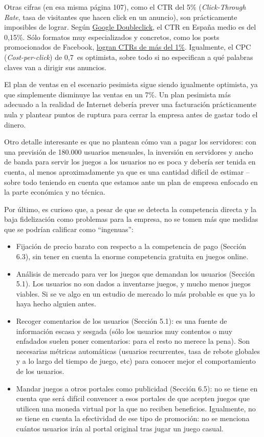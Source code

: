 \documentclass[nochap,palatino,shortheader]{apuntes}
\begin{document}
Otras cifras (en esa misma página 107), como el CTR del 5\% (\textit{Click-Through Rate}, tasa de visitantes que hacen click en un anuncio), son prácticamente imposibles de lograr. Según \href{http://www.richmediagallery.com/tools/benchmarks}{Google Doubleclick}, el CTR en España medio es del 0,15\%. Sólo formatos muy especializados y concretos, como los posts promocionados de Facebook, \href{http://www.smartinsights.com/social-media-marketing/facebook-marketing/facebook-ad-formats-work-best-boosted-posts-vs-promoted-posts-vs-separate-ads-test/}{logran CTRs de más del 1\%}. Igualmente, el CPC (\textit{Cost-per-click}) de 0,7\texteuro\ es optimista, sobre todo si no especifican a qué palabras claves van a dirigir sus anuncios.

El plan de ventas en el escenario pesimista sigue siendo igualmente optimista, ya que simplemente disminuye las ventas en un 7\%. Un plan pesimista más adecuado a la realidad de Internet debería prever una facturación prácticamente nula y plantear puntos de ruptura para cerrar la empresa antes de gastar todo el dinero.

Otro detalle interesante es que no plantean cómo van a pagar los servidores: con una previsión de 180.000 usuarios mensuales, la inversión en servidores y ancho de banda para servir los juegos a los usuarios no es poca y debería ser tenida en cuenta, al menos aproximadamente ya que es una cantidad difícil de estimar -- sobre todo teniendo en cuenta que estamos ante un plan de empresa enfocado en la parte económica y no técnica.

Por último, es curioso que, a pesar de que se detecta la competencia directa y la baja fidelización como problemas para la empresa, no se tomen más que medidas que se podrían calificar como ``ingenuas'':

\begin{itemize}
\item Fijación de precio barato con respecto a la competencia de pago (Sección 6.3), sin tener en cuenta la enorme competencia gratuita en juegos online.
\item Análisis de mercado para ver los juegos que demandan los usuarios (Sección 5.1). Los usuarios no son dados a inventarse juegos, y mucho menos juegos viables. Si se ve algo en un estudio de mercado lo más probable es que ya lo haya hecho alguien antes.
\item Recoger comentarios de los usuarios (Sección 5.1): es una fuente de información escasa y sesgada (sólo los usuarios muy contentos o muy enfadados suelen poner comentarios: para el resto no merece la pena). Son necesarias métricas automáticas (usuarios recurrentes, tasa de rebote globales y a lo largo del tiempo de juego, etc) para conocer mejor el comportamiento de los usuarios.
\item Mandar juegos a otros portales como publicidad (Sección 6.5): no se tiene en cuenta que será difícil convencer a esos portales de que acepten juegos que utilicen una moneda virtual por la que no reciben beneficios. Igualmente, no se tiene en cuenta la efectividad de ese tipo de promoción: no se menciona cuántos usuarios irán al portal original tras jugar un juego casual.
\end{itemize}
\end{document}
